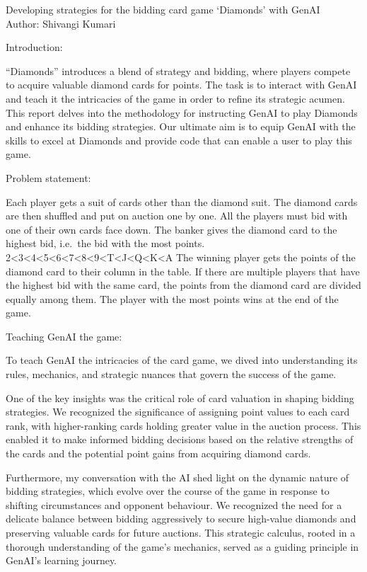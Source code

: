 \documentclass[
]{article}
\author{}
\date{}
\begin{document}
Developing strategies for the bidding card game `Diamonds' with GenAI\\
Author: Shivangi Kumari

Introduction:

``Diamonds'' introduces a blend of strategy and bidding, where players
compete to acquire valuable diamond cards for points. The task is to
interact with GenAI and teach it the intricacies of the game in order to
refine its strategic acumen. This report delves into the methodology for
instructing GenAI to play Diamonds and enhance its bidding strategies.
Our ultimate aim is to equip GenAI with the skills to excel at Diamonds
and provide code that can enable a user to play this game.

Problem statement:

Each player gets a suit of cards other than the diamond suit. The
diamond cards are then shuffled and put on auction one by one. All the
players must bid with one of their own cards face down. The banker gives
the diamond card to the highest bid, i.e.~the bid with the most points.
2\textless3\textless4\textless5\textless6\textless7\textless8\textless9\textless T\textless J\textless Q\textless K\textless A
The winning player gets the points of the diamond card to their column
in the table. If there are multiple players that have the highest bid
with the same card, the points from the diamond card are divided equally
among them. The player with the most points wins at the end of the game.

Teaching GenAI the game:

To teach GenAI the intricacies of the card game, we dived into
understanding its rules, mechanics, and strategic nuances that govern
the success of the game.

One of the key insights was the critical role of card valuation in
shaping bidding strategies. We recognized the significance of assigning
point values to each card rank, with higher-ranking cards holding
greater value in the auction process. This enabled it to make informed
bidding decisions based on the relative strengths of the cards and the
potential point gains from acquiring diamond cards.

Furthermore, my conversation with the AI shed light on the dynamic
nature of bidding strategies, which evolve over the course of the game
in response to shifting circumstances and opponent behaviour. We
recognized the need for a delicate balance between bidding aggressively
to secure high-value diamonds and preserving valuable cards for future
auctions. This strategic calculus, rooted in a thorough understanding of
the game's mechanics, served as a guiding principle in GenAI's learning
journey.
\end{document}
